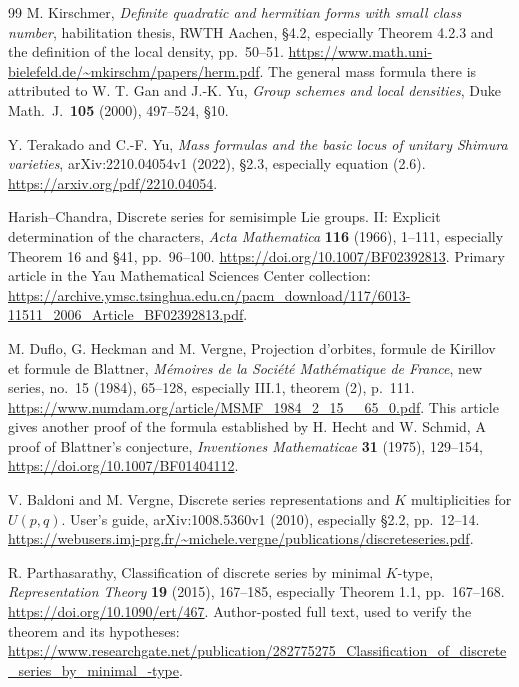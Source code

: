\documentclass[11pt,a4paper]{article}
\theoremstyle{remark}
\begin{document}
\begin{thebibliography}{99}
M. Kirschmer, \emph{Definite quadratic and hermitian forms with
small class number}, habilitation thesis, RWTH Aachen,
\S4.2, especially Theorem 4.2.3 and the definition of the local density,
pp.\ 50--51.
\url{https://www.math.uni-bielefeld.de/~mkirschm/papers/herm.pdf}.
The general mass formula there is attributed to
W. T. Gan and J.-K. Yu, \emph{Group schemes and local densities},
Duke Math.\ J.\ \textbf{105} (2000), 497--524, \S10.

Y. Terakado and C.-F. Yu, \emph{Mass formulas and the basic locus
of unitary Shimura varieties}, arXiv:2210.04054v1 (2022),
\S2.3, especially equation (2.6).
\url{https://arxiv.org/pdf/2210.04054}.

Harish--Chandra, Discrete series for semisimple Lie groups. II:
Explicit determination of the characters,
\emph{Acta Mathematica} \textbf{116} (1966), 1--111,
especially Theorem 16 and \S41, pp.\ 96--100.
\url{https://doi.org/10.1007/BF02392813}.
Primary article in the Yau Mathematical Sciences Center collection:
\url{https://archive.ymsc.tsinghua.edu.cn/pacm_download/117/6013-11511_2006_Article_BF02392813.pdf}.

M. Duflo, G. Heckman and M. Vergne,
Projection d'orbites, formule de Kirillov et formule de Blattner,
\emph{M\'emoires de la Soci\'et\'e Math\'ematique de France},
new series, no.\ 15 (1984), 65--128, especially III.1,
theorem (2), p.\ 111.
\url{https://www.numdam.org/article/MSMF_1984_2_15__65_0.pdf}.
This article gives another proof of the formula established by
H. Hecht and W. Schmid, A proof of Blattner's conjecture,
\emph{Inventiones Mathematicae} \textbf{31} (1975), 129--154,
\url{https://doi.org/10.1007/BF01404112}.

V. Baldoni and M. Vergne,
Discrete series representations and $K$ multiplicities for
$U(p,q)$. User's guide, arXiv:1008.5360v1 (2010),
especially \S2.2, pp.\ 12--14.
\url{https://webusers.imj-prg.fr/~michele.vergne/publications/discreteseries.pdf}.

R. Parthasarathy, Classification of discrete series by minimal $K$-type,
\emph{Representation Theory} \textbf{19} (2015), 167--185,
especially Theorem 1.1, pp.\ 167--168.
\url{https://doi.org/10.1090/ert/467}.
Author-posted full text, used to verify the theorem and its hypotheses:
\url{https://www.researchgate.net/publication/282775275_Classification_of_discrete_series_by_minimal_-type}.


\end{thebibliography}
\end{document}
